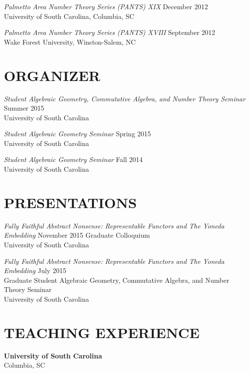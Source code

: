 \documentclass[line,overlapped]{res}
\begin{document}
\begin{resume}
                          {\sl Palmetto Area Number Theory Series (PANTS) XIX} \hfill December 2012\\
                          University of South Carolina, Columbia, SC

                          {\sl Palmetto Area Number Theory Series (PANTS) XVIII} \hfill September 2012\\
                          Wake Forest University, Winston-Salem, NC

	      \section{ORGANIZER}
		     {\sl Student Algebraic Geometry, Commutative Algebra, and Number Theory Seminar} \hfill Summer 2015\\
		      University of South Carolina
	                
                           {\sl Student Algebraic Geometry Seminar} \hfill Spring 2015\\
		      University of South Carolina

                           {\sl Student Algebraic Geometry Seminar} \hfill Fall 2014\\
		      University of South Carolina
                 \section{PRESENTATIONS}
                          {\sl Fully Faithful Abstract Nonsense: Representable Functors and The Yoneda Embedding} \hfill November 2015
                          Graduate Colloquium\\
                          University of South Carolina

                          {\sl Fully Faithful Abstract Nonsense: Representable Functors and The Yoneda Embedding} \hfill July 2015\\
                          Graduate Student Algebraic Geometry, Commutative Algebra, and Number Theory Seminar\\
                          University of South Carolina
                          \section{TEACHING EXPERIENCE}
                          {\bf University of South Carolina}\\Columbia, SC
                          

\end{resume}
\end{document}
